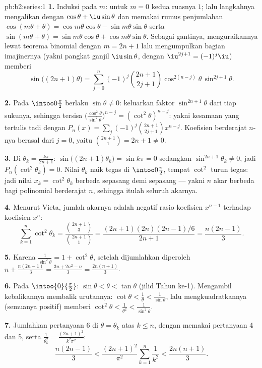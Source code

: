 \begin{solution}{pb:b2:series:1}
\textbf{1.} Induksi pada $m$: untuk $m = 0$ kedua ruasnya $1$;
lalu langkahnya mengalikan dengan $\cos\theta + \iu\sin\theta$ dan
memakai rumus penjumlahan $\cos(m\theta + \theta) =
\cos m\theta\cos\theta - \sin m\theta\sin\theta$ serta $\sin(m\theta
+ \theta) = \sin m\theta\cos\theta + \cos m\theta\sin\theta$.
Sebagai gantinya, menguraikannya lewat teorema binomial dengan $m =
2n+1$ lalu mengumpulkan bagian imajinernya (yakni pangkat ganjil
$\iu\sin\theta$, dengan $\iu^{2j+1} = (-1)^j\iu$) memberi
\[
\sin\bigl((2n{+}1)\theta\bigr) = \sum_{j=0}^{n}(-1)^j
\binom{2n+1}{2j+1}\cos^{2(n-j)}\theta\,\sin^{2j+1}\theta .
\]

\textbf{2.} Pada $\intoo0{\frac\pi2}$ berlaku $\sin\theta \neq 0$:
keluarkan faktor $\sin^{2n+1}\theta$ dari tiap sukunya, sehingga tersisa
$\bigl(\frac{\cos^2\theta}{\sin^2\theta}\bigr)^{n-j} =
(\cot^2\theta)^{n-j}$: yakni kesamaan yang tertulis tadi dengan $P_n(x) =
\sum_j(-1)^j\binom{2n+1}{2j+1}x^{n-j}$. Koefisien berderajat $n$-nya
berasal dari $j = 0$, yaitu $\binom{2n+1}{1} = 2n + 1 \neq 0$.

\textbf{3.} Di $\theta_k = \frac{k\pi}{2n+1}$:
$\sin\bigl((2n{+}1)\theta_k\bigr) = \sin k\pi = 0$ sedangkan
$\sin^{2n+1}\theta_k \neq 0$, jadi $P_n(\cot^2\theta_k) = 0$. Nilai
$\theta_k$ naik tegas di $\intoo0{\frac\pi2}$, tempat
$\cot^2$ turun tegas: jadi nilai $x_k =
\cot^2\theta_k$ berbeda sepasang demi sepasang --- yakni $n$ akar
berbeda bagi polinomial berderajat $n$, sehingga itulah seluruh akarnya.

\textbf{4.} Menurut Vieta, jumlah akarnya adalah negatif rasio
koefisien $x^{n-1}$ terhadap koefisien $x^n$:
\[
\sum_{k=1}^{n}\cot^2\theta_k =
\frac{\binom{2n+1}{3}}{\binom{2n+1}{1}}
= \frac{(2n+1)(2n)(2n-1)/6}{2n+1} = \frac{n(2n-1)}{3}.
\]

\textbf{5.} Karena $\frac{1}{\sin^2\theta} = 1 + \cot^2\theta$, setelah
dijumlahkan diperoleh $n + \frac{n(2n-1)}3 = \frac{3n + 2n^2 - n}{3} =
\frac{2n(n+1)}{3}$.

\textbf{6.} Pada $\intoo{0}{\frac\pi2}$: $\sin\theta < \theta <
\tan\theta$ (jilid Tahun ke-1). Mengambil kebalikannya membalik
urutannya: $\cot\theta < \frac1\theta < \frac1{\sin\theta}$, lalu
mengkuadratkannya (semuanya positif) memberi $\cot^2\theta <
\frac1{\theta^2} < \frac1{\sin^2\theta}$.

\textbf{7.} Jumlahkan pertanyaan 6 di $\theta = \theta_k$ atas $k \leq
n$, dengan memakai pertanyaan 4 dan 5, serta $\frac1{\theta_k^2} =
\frac{(2n+1)^2}{k^2\pi^2}$:
\[
\frac{n(2n-1)}3 < \frac{(2n+1)^2}{\pi^2}\sum_{k=1}^n\frac1{k^2}
< \frac{2n(n+1)}3 .
\]


\end{solution}
